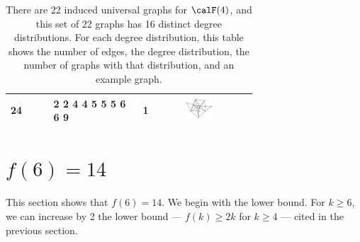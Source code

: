 \begin{table}[h!]
\begin{tabular}{m{0.12\linewidth} m{0.25\linewidth} m{0.12\linewidth} m{0.2\linewidth}}
24 & 2 2 4 4 5 5 5 6 6 9 & 1 & \includegraphics[width=1cm]{15-universal-graphs/img/degree-sequences-example-graphs/graph-5-10-15} \\
\bottomrule
\end{tabular}
\caption{There are 22 induced universal graphs for $\calF(4)$, and this set of
    22 graphs has 16 distinct degree distributions.  For each degree distribution,
    this table shows the number of edges, the
    degree distribution, the number of graphs with that distribution,
    and an example graph.}
\label{tab:f5-degree-distributions}
\end{table}

\section{\texorpdfstring{$f(6) = 14$}{f(6)=14}}\label{sec:f6}

This section shows that $f(6) = 14$.  We begin with the lower bound.
For $k \geq 6$, we can increase by 2 the lower bound --- $f(k) \geq 2k$
for $k \geq 4$ --- cited in the previous section.

